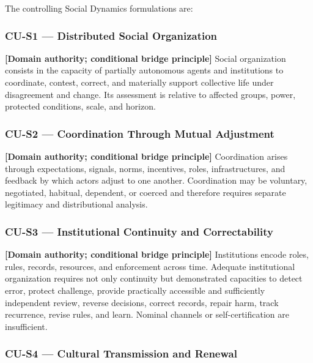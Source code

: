 \documentclass[
  11pt,
]{article}
\begin{document}
The controlling Social Dynamics formulations are:

\subsubsection{CU-S1 --- Distributed Social
Organization}\label{cu-s1-distributed-social-organization}

\textbf{{[}Domain authority; conditional bridge principle{]}} Social
organization consists in the capacity of partially autonomous agents and
institutions to coordinate, contest, correct, and materially support
collective life under disagreement and change. Its assessment is
relative to affected groups, power, protected conditions, scale, and
horizon.

\subsubsection{CU-S2 --- Coordination Through Mutual
Adjustment}\label{cu-s2-coordination-through-mutual-adjustment}

\textbf{{[}Domain authority; conditional bridge principle{]}}
Coordination arises through expectations, signals, norms, incentives,
roles, infrastructures, and feedback by which actors adjust to one
another. Coordination may be voluntary, negotiated, habitual, dependent,
or coerced and therefore requires separate legitimacy and distributional
analysis.

\subsubsection{CU-S3 --- Institutional Continuity and
Correctability}\label{cu-s3-institutional-continuity-and-correctability}

\textbf{{[}Domain authority; conditional bridge principle{]}}
Institutions encode roles, rules, records, resources, and enforcement
across time. Adequate institutional organization requires not only
continuity but demonstrated capacities to detect error, protect
challenge, provide practically accessible and sufficiently independent
review, reverse decisions, correct records, repair harm, track
recurrence, revise rules, and learn. Nominal channels or
self-certification are insufficient.

\subsubsection{CU-S4 --- Cultural Transmission and
Renewal}\label{cu-s4-cultural-transmission-and-renewal}
\end{document}

